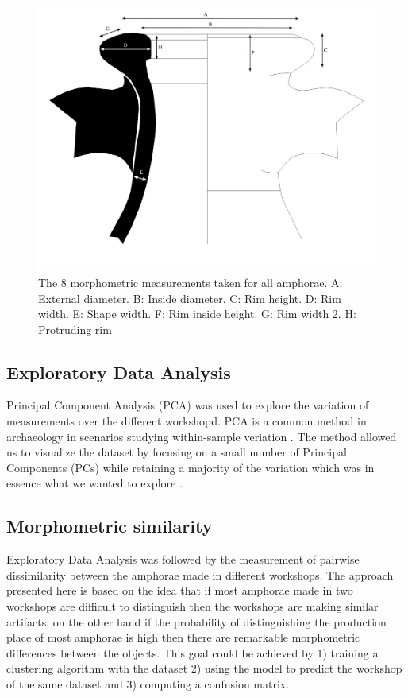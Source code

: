 \documentclass[review]{elsarticle}
\begin{document}
\begin{figure}[htp]
	\centering
\includegraphics[width=\linewidth]{figs/mesures.png}
\caption{The 8 morphometric measurements taken for all amphorae. A: External diameter. B: Inside diameter. C: Rim height. D: Rim width. E: Shape width. F: Rim inside height. G: Rim width 2. H: Protruding rim}
\label{mesures}
\end{figure} 

\subsection{Exploratory Data Analysis}


Principal Component Analysis (PCA) was used to explore the variation of measurements over the different workshopd. PCA is a common method in archaeology in scenarios studying within-sample veriation \citep{ shennan_quantifying_1997, li_crossbows_2014, schillinger_differences_2016}. The method allowed us to visualize the dataset by focusing on a small number of Principal Components (PCs) while retaining a majority of the variation which was in essence what we wanted to explore \citep{jolliffe_principal_2002}. 

\subsection{Morphometric similarity} 

Exploratory Data Analysis was followed by the measurement of pairwise dissimilarity between the amphorae made in different workshops. The approach presented here is based on the idea that if most amphorae made in two workshops are difficult to distinguish then the workshops are making similar artifacts; on the other hand if the probability of distinguishing the production place of most amphorae is high then there are remarkable morphometric differences between the objects. This goal could be achieved by 1) training a clustering algorithm with the dataset 2) using the model to predict the workshop of the same dataset and 3) computing a confusion matrix.
\end{document}
